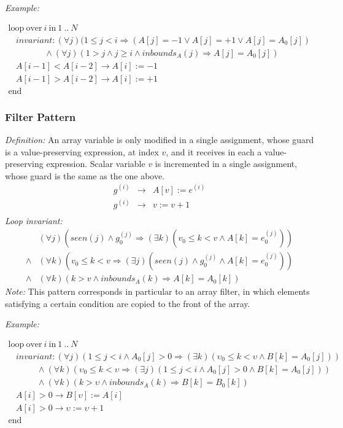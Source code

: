 \documentclass[a4paper,10pt]{article}
\newcommand{\idx}{\ensuremath{i}\xspace}
\newcommand{\at}[1]{{(#1)}}
\newcommand{\KWloop}{\ensuremath{\mathrm{loop}~}}
\newcommand{\KWend}{\ensuremath{\mathrm{end}~}}
\newcommand{\KWover}{\ensuremath{\mathrm{over}~}}
\newcommand{\KWin}{\ensuremath{~\mathrm{in}~}}
\newcommand{\impl}{\ensuremath{\Longrightarrow}}
\newcommand{\inbounds}[2]{\ensuremath{\mathit{inbounds}_{#1}(#2)}\xspace}
\newcommand{\seen}[1]{\ensuremath{\mathit{seen}(#1)}\xspace}
\newcommand{\loopinvariant}{\noindent\textit{Loop invariant:}\xspace}
\newcommand{\patterndef}{\noindent\textit{Definition:}\xspace}
\newcommand{\patternexample}{\noindent\textit{Example:}\xspace}
\newcommand{\patternnote}{\noindent\textit{Note:}\xspace}
\begin{document}
\bigskip
\patternexample

\medskip
$\begin{array}{l}
  \KWloop \KWover i \KWin 1~..~N \\
  ~~~~ \textit{invariant}: (\forall j)(1 \leq j < i \impl (A[j] = -1 \lor A[j] = +1 \lor A[j] = A_0[j])\\
  ~~~~~~~~~~~~~~~~~~~ \land (\forall j)(1 > j \land j \geq i \land \inbounds{A}{j}\impl A[j] = A_0[j])\\
  ~~~~ A[i-1] < A[i-2] \rightarrow A[i] := -1\\
  ~~~~ A[i-1] > A[i-2] \rightarrow A[i] := +1\\
  \KWend
\end{array}$

\subsubsection*{Filter Pattern}

\patterndef An array variable is only modified in a single assignment, whose
guard is a value-preserving expression, at index $v$, and it receives in each a 
value-preserving expression. Scalar variable $v$ is incremented in a single assignment, 
whose guard is the same as the one above.
%
\begin{eqnarray*}
g^\at{\idx} &\rightarrow& A[v] := e^\at{\idx}\\
g^\at{\idx} &\rightarrow& v := v + 1\\
\end{eqnarray*}
%
\loopinvariant
%
\begin{eqnarray*}
&(\forall j)(\seen{j} \land g_0^\at{j} \impl (\exists k)(v_0 \leq k < v \land A[k] = e_0^\at{j}))  \\
\land&
(\forall k)(v_0 \leq k < v \impl (\exists j)(\seen{j} \land g_0^\at{j} \land A[k] = e_0^\at{j}))  \\
\land&
(\forall k)(k > v \land \inbounds{A}{k} \impl A[k] = A_0[k])
\end{eqnarray*}
%
\patternnote This pattern corresponds in particular to an array filter, in
which elements satisfying a certain condition are copied to the front of the
array.

\bigskip
\patternexample

\medskip
$\begin{array}{l}
  \KWloop \KWover i \KWin 1~..~N \\
  ~~~~ \textit{invariant}: (\forall j)(1 \leq j < i \land A_0[j] > 0 \impl (\exists k)(\upsilon_0 \leq k < \upsilon \land B[k] = A_0[j]))\\
  ~~~~~~~~~~~~~~~ \land (\forall k)(\upsilon_0 \leq k < \upsilon \impl (\exists j)(1 \leq j < i \land  A_0[j] > 0 \land B[k] = A_0[j]))\\
  ~~~~~~~~~~~~~~~ \land (\forall k)(k > \upsilon \land \inbounds{A}{k} \impl B[k] = B_0[k])\\
  ~~~~ A[i] > 0 \rightarrow B[\upsilon] := A[i]\\
  ~~~~ A[i] > 0 \rightarrow \upsilon := \upsilon + 1\\
  \KWend
\end{array}$
\end{document}
